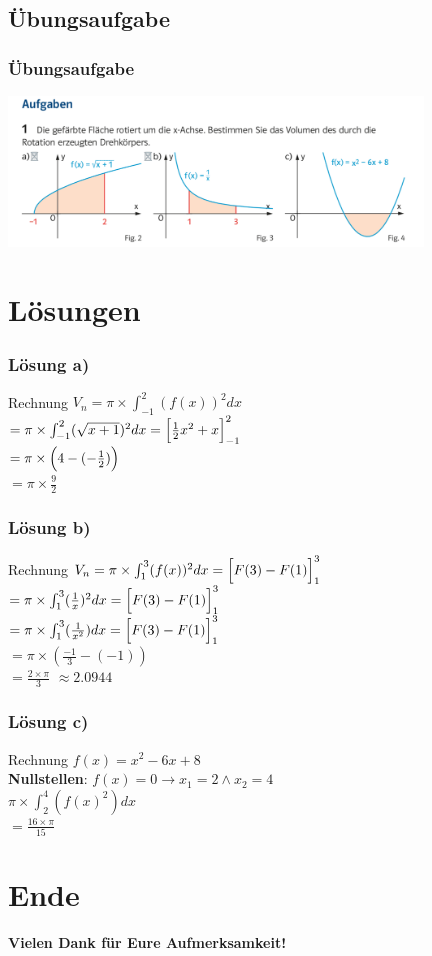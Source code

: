 \documentclass{beamer}
\begin{document}
	\begin{frame}
		\section{Übungsaufgabe}
		\frametitle{Übungsaufgabe}
		\includegraphics[width=11cm]{IMG_58408E42A4CB-1.JPEG}
	\end{frame}
	
	\section{Lösungen}
	\begin{frame}
		\frametitle{Lösung a)}
		\begin{block}{Rechnung}
			$V_n = \pi \times \int_{-1}^{2} (f(x))^2 dx$ \\
			$= \pi \times \int_{-1}^{2} (\sqrt{x+1})^2 dx = \Bigl[\frac{1}{2}x^2 + x\Bigl]_{-1}^{2}$ \\
			$= \pi \times \Bigl(4 - (-\frac{1}{2})\Bigl)$ \\
			$= \pi \times \frac{9}{2}$ \\
		\end{block}
	\end{frame}
	
	\begin{frame}
		\frametitle{Lösung b)}

		\begin{block}{Rechnung}	
			$V_n = \pi \times \int_{1}^{3}(f(x))^2 dx = \Bigl[F(3) - F(1)\Bigl]_{1}^{3}$ \\
			$= \pi \times \int_{1}^{3}(\frac{1}{x})^2 dx = \Bigl[F(3) - F(1)\Bigl]_{1}^{3}$ \\
			$= \pi \times \int_{1}^{3}(\frac{1}{x^2}) dx = \Bigl[F(3) - F(1)\Bigl]_{1}^{3}$ \\
			$= \pi \times (\frac{-1}{3}-(-1))$ \\
			$= \frac{2 \times \pi}{3}$ $\approx 2.0944$
		\end{block}

	\end{frame}
	
	\begin{frame}
		\frametitle{Lösung c)}
		\begin{block}{Rechnung}
			$f(x) = x^2 - 6x + 8$ \\
			\textbf{Nullstellen}: $f(x) = 0 \to x_1 = 2 \land x_2 = 4$ \\
			$\pi \times \int_{2}^{4}(f(x)^2) dx$ \\
			$= \frac{16\times\pi}{15}$
		\end{block}
	\end{frame}
	
	\section{Ende}
	\begin{frame}
		\centering
		\Huge{
			\textbf{Vielen Dank für Eure Aufmerksamkeit!}
		}
	\end{frame}
\end{document}
